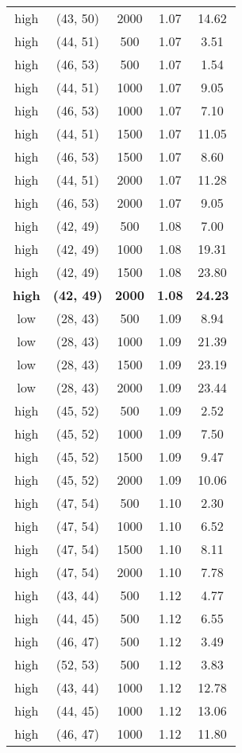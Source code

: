 \begin{tabular}{c c c c c}
high & (43, 50) &  2000 & 1.07 & 14.62 \\
high & (44, 51) &  500 & 1.07 & 3.51 \\
high & (46, 53) &  500 & 1.07 & 1.54 \\
high & (44, 51) &  1000 & 1.07 & 9.05 \\
high & (46, 53) &  1000 & 1.07 & 7.10 \\
high & (44, 51) &  1500 & 1.07 & 11.05 \\
high & (46, 53) &  1500 & 1.07 & 8.60 \\
high & (44, 51) &  2000 & 1.07 & 11.28 \\
high & (46, 53) &  2000 & 1.07 & 9.05 \\
high & (42, 49) &  500 & 1.08 & 7.00 \\
high & (42, 49) &  1000 & 1.08 & 19.31 \\
high & (42, 49) &  1500 & 1.08 & 23.80 \\
\textbf{high} & \textbf{(42, 49)} & \textbf{ 2000} & \textbf{1.08} & \textbf{24.23} \\
low & (28, 43) &  500 & 1.09 & 8.94 \\
low & (28, 43) &  1000 & 1.09 & 21.39 \\
low & (28, 43) &  1500 & 1.09 & 23.19 \\
low & (28, 43) &  2000 & 1.09 & 23.44 \\
high & (45, 52) &  500 & 1.09 & 2.52 \\
high & (45, 52) &  1000 & 1.09 & 7.50 \\
high & (45, 52) &  1500 & 1.09 & 9.47 \\
high & (45, 52) &  2000 & 1.09 & 10.06 \\
high & (47, 54) &  500 & 1.10 & 2.30 \\
high & (47, 54) &  1000 & 1.10 & 6.52 \\
high & (47, 54) &  1500 & 1.10 & 8.11 \\
high & (47, 54) &  2000 & 1.10 & 7.78 \\
high & (43, 44) &  500 & 1.12 & 4.77 \\
high & (44, 45) &  500 & 1.12 & 6.55 \\
high & (46, 47) &  500 & 1.12 & 3.49 \\
high & (52, 53) &  500 & 1.12 & 3.83 \\
high & (43, 44) &  1000 & 1.12 & 12.78 \\
high & (44, 45) &  1000 & 1.12 & 13.06 \\
high & (46, 47) &  1000 & 1.12 & 11.80 \\

\end{tabular}
